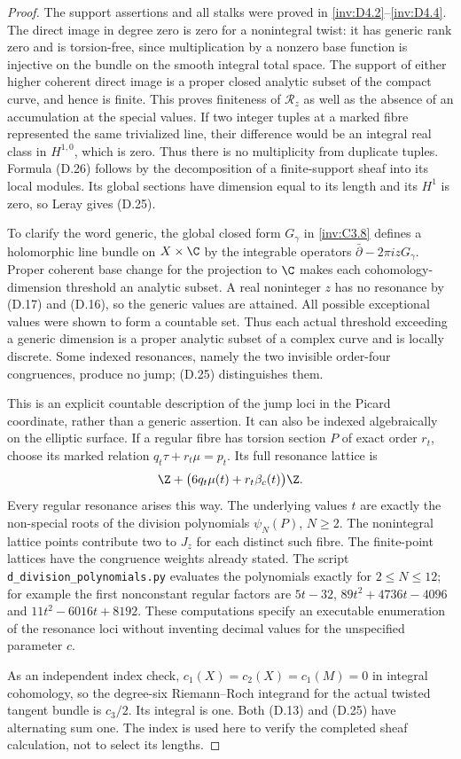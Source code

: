 \begin{proof}
The support assertions and all stalks were proved in \ref{inv:D4.2}--\ref{inv:D4.4}.
The direct image in degree zero is zero for a nonintegral twist:
it has generic rank zero and is torsion-free, since multiplication
by a nonzero base function is injective on the bundle on the smooth
integral total space. The support of either higher coherent direct
image is a proper closed analytic subset of the compact curve,
and hence is finite. This proves finiteness of $\mathcal R_z$ as
well as the absence of an accumulation at the special values.
If two integer tuples at a marked fibre represented the same
trivialized line, their difference would be an integral real class
in $H^{1,0}$, which is zero. Thus there is no multiplicity from
duplicate tuples. Formula (D.26) follows by the decomposition of a
finite-support sheaf into its local modules. Its global sections
have dimension equal to its length and its $H^1$ is zero, so Leray
gives (D.25).

To clarify the word generic, the global closed form $G_\gamma$ in
\ref{inv:C3.8} defines a holomorphic line bundle on $X\times\C$ by the
integrable operators $\bar\partial-2\pi i zG_\gamma$. Proper
coherent base change for the projection to $\C$ makes each
cohomology-dimension threshold an analytic subset. A real noninteger
$z$ has no resonance by (D.17) and (D.16), so the generic values are
attained. All possible exceptional values were shown to form a
countable set. Thus each actual threshold exceeding a generic
dimension is a proper analytic subset of a complex curve and is
locally discrete. Some indexed resonances, namely the two invisible
order-four congruences, produce no jump; (D.25) distinguishes them.

This is an explicit countable description of the jump loci in the
Picard coordinate, rather than a generic assertion. It can also be
indexed algebraically on the elliptic surface. If a regular fibre
has torsion section $P$ of exact order $r_t$, choose its marked
relation $q_t\tau+r_t\mu=p_t$. Its full resonance lattice is
\[
 \Z+\bigl(6q_t\mu(t)+r_t\beta_c(t)\bigr)\Z.
\]
Every regular resonance arises this way. The underlying values
$t$ are exactly the non-special roots of the division polynomials
$\psi_N(P)$, $N\ge2$. The nonintegral lattice points contribute two
to $J_z$ for each distinct such fibre. The finite-point lattices
have the congruence weights already stated. The script
\texttt{d\_division\_polynomials.py} evaluates the polynomials
exactly for $2\le N\le12$; for example the first nonconstant
regular factors are $5t-32$, $89t^2+4736t-4096$ and
$11t^2-6016t+8192$. These computations specify an executable
enumeration of the resonance loci without inventing decimal values
for the unspecified parameter $c$.

As an independent index check, $c_1(X)=c_2(X)=c_1(M)=0$ in integral
cohomology, so the degree-six Riemann--Roch integrand for the actual
twisted tangent bundle is $c_3/2$. Its integral is one. Both (D.13)
and (D.25) have alternating sum one. The index is used here to
verify the completed sheaf calculation, not to select its lengths.
\end{proof}

